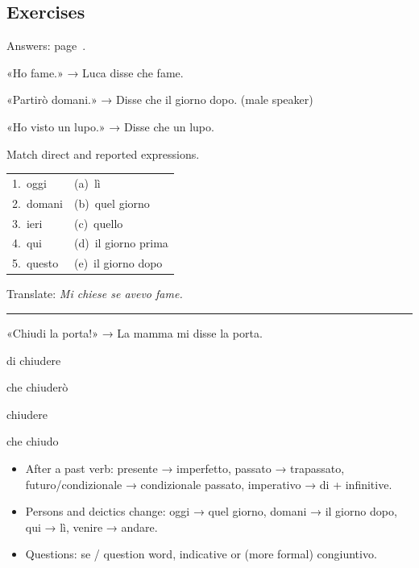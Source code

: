 \documentclass[11pt,a4paper,twoside,openright]{book}
\newcommand{\blank}{\underline{\hspace{2.6cm}}}
\newcommand{\answerline}{\par\vspace{6pt}\noindent\rule{0.75\linewidth}{0.4pt}\par}
\begin{document}
\subsection*{Exercises}\label{les:discorso-indiretto:exercises}
{\color{muted}\small Answers: page~\pageref{ans:discorso-indiretto}.}

\begin{exercises}
\item\label{ex:discorso-indiretto-1}\relax «Ho fame.» → Luca disse che \blank{} fame.
\item\label{ex:discorso-indiretto-2}\relax «Partirò domani.» → Disse che \blank{} il giorno dopo. (male speaker)
\item\label{ex:discorso-indiretto-3}\relax «Ho visto un lupo.» → Disse che \blank{} un lupo.
\item\label{ex:discorso-indiretto-4}\relax Match direct and reported expressions.\par\smallskip\begin{tabularx}{\linewidth}{@{}L L@{}}
1.\ oggi & (a)\ lì \\
2.\ domani & (b)\ quel giorno \\
3.\ ieri & (c)\ quello \\
4.\ qui & (d)\ il giorno prima \\
5.\ questo & (e)\ il giorno dopo \\
\end{tabularx}
\item\label{ex:discorso-indiretto-5}\relax Translate: \textit{Mi chiese se avevo fame.}\par\answerline
\item\label{ex:discorso-indiretto-6}\relax «Chiudi la porta!» → La mamma mi disse \blank{} la porta.\par\nopagebreak\begin{options}
\item\relax di chiudere
\item\relax che chiuderò
\item\relax chiudere
\item\relax che chiudo
\end{options}
\end{exercises}

\begin{summarybox}
\begin{itemize}
\item\relax After a past verb: presente → imperfetto, passato → trapassato, futuro/condizionale → condizionale passato, imperativo → di + infinitive.
\item\relax Persons and deictics change: oggi → quel giorno, domani → il giorno dopo, qui → lì, venire → andare.
\item\relax Questions: se / question word, indicative or (more formal) congiuntivo.
\end{itemize}
\end{summarybox}
\end{document}
